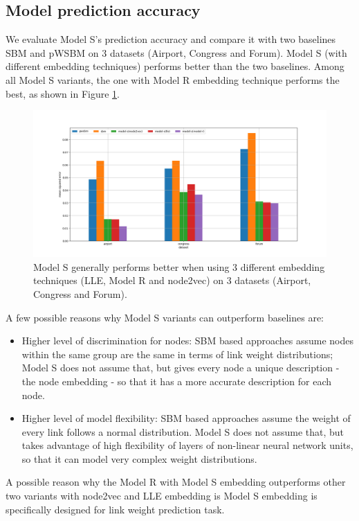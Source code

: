 \documentclass{article} %
\begin{document}
\subsection{Model prediction accuracy}
We evaluate Model S's prediction accuracy and compare it with two baselines SBM and pWSBM on 3 datasets (Airport, Congress and Forum).
Model S (with different embedding techniques) performs better than the two baselines.
Among all Model S variants,
the one with Model R embedding technique performs the best,
as shown in Figure \ref{fig:errors}.
\begin{figure}[h] \centering
	\includegraphics[width=1\linewidth]{weight-errors}
	\caption{
		Model S generally performs better when using 3 different embedding techniques (LLE, Model R and node2vec) on 3 datasets (Airport, Congress and Forum).
	}
	\label{fig:errors}
\end{figure}

A few possible reasons why Model S variants can outperform baselines are:
\begin{itemize}
	\item Higher level of discrimination for nodes:
	SBM based approaches assume nodes within the same group are the same in terms of link weight distributions;
	Model S does not assume that,
	but gives every node a unique description - the node embedding - so that
	it has a more accurate description for each node.
	\item Higher level of model flexibility:
	SBM based approaches assume the weight of every link follows
	a normal distribution.
	Model S does not assume that, but takes advantage of high flexibility of
	layers of non-linear neural network units,
	so that it can model very complex weight distributions.
\end{itemize}
A possible reason why the Model R with Model S embedding outperforms other two variants with node2vec and LLE embedding is Model S embedding is specifically designed for link weight prediction task.
\end{document}
